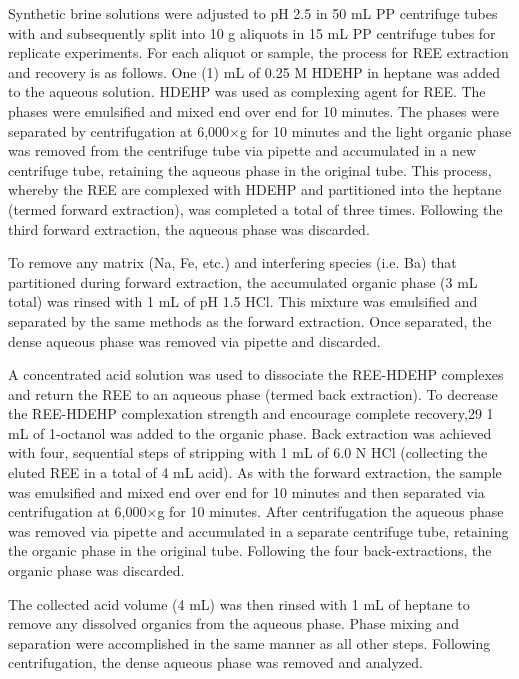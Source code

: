 Synthetic brine solutions were adjusted to pH 2.5 in 50 mL PP centrifuge tubes with  and subsequently split into 10 g aliquots in 15 mL PP centrifuge tubes for replicate experiments.
For each aliquot or sample, the process for REE extraction and recovery is as follows.
One (1) mL of 0.25 M HDEHP in heptane was added to the aqueous solution.
HDEHP was used as complexing agent for REE.
The phases were emulsified and mixed end over end for 10 minutes.
The phases were separated by centrifugation at 6,000$\times$g for 10 minutes and the light organic phase was removed from the centrifuge tube via pipette and accumulated in a new centrifuge tube, retaining the aqueous phase in the original tube.
This process, whereby the REE are complexed with HDEHP and partitioned into the heptane (termed forward extraction), was completed a total of three times.
Following the third forward extraction, the aqueous phase was discarded.

To remove any matrix (Na, Fe, etc.) and interfering species (i.e. Ba) that partitioned during forward extraction, the accumulated organic phase (3 mL total) was rinsed with 1 mL of pH 1.5 HCl.
This mixture was emulsified and separated by the same methods as the forward extraction.
Once separated, the dense aqueous phase was removed via pipette and discarded.

A concentrated acid solution was used to dissociate the REE-HDEHP complexes and return the REE to an aqueous phase (termed back extraction).
To decrease the REE-HDEHP complexation strength and encourage complete recovery,29
1 mL of 1-octanol was added to the organic phase.
Back extraction was achieved with four, sequential steps of stripping with 1 mL of 6.0 N HCl (collecting the eluted REE in a total of 4 mL acid).
As with the forward extraction, the sample was emulsified and mixed end over end for 10 minutes and then separated via centrifugation at 6,000$\times$g for 10 minutes.
After centrifugation the aqueous phase was removed via pipette and accumulated in a separate centrifuge tube, retaining the organic phase in the original tube.
Following the four back-extractions, the organic phase was discarded.

The collected acid volume (4 mL) was then rinsed with 1 mL of heptane to remove any dissolved organics from the aqueous phase.
Phase mixing and separation were accomplished in the same manner as all other steps.
Following centrifugation, the dense aqueous phase was removed and analyzed.

